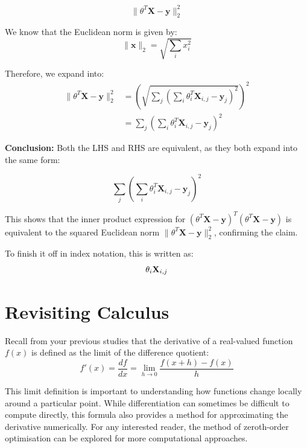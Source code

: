 \begin{equation}
    \| \theta^T \mathbf{X} - \mathbf{y} \|_2^2
\end{equation}

We know that the Euclidean norm is given by:
\begin{equation}
    \| \mathbf{x} \|_2 = \sqrt{\sum_i x_i^2}
\end{equation}

Therefore, we expand into:
\begin{align}
    \| \theta^T \mathbf{X} - \mathbf{y} \|_2^2 & = \left( \sqrt{\sum_j \left( \sum_i \theta_i^T \mathbf{X}_{i,j} - \mathbf{y}_j \right)^2} \right)^2 \\
                                               & = \sum_j \left( \sum_i \theta_i^T \mathbf{X}_{i,j} - \mathbf{y}_j \right)^2
\end{align}


\bigskip

\textbf{Conclusion:} Both the LHS and RHS are equivalent, as they both expand into the same form:

\begin{equation}
    \sum_j \left( \sum_i \theta_i^T \mathbf{X}_{i,j} - \mathbf{y}_j \right)^2
\end{equation}

This shows that the inner product expression for \( (\theta^T \mathbf{X} - \mathbf{y})^T (\theta^T \mathbf{X} - \mathbf{y}) \) is equivalent to the squared Euclidean norm \( \| \theta^T \mathbf{X} - \mathbf{y} \|_2^2 \), confirming the claim.
\bigskip

To finish it off in index notation, this is written as:
\begin{equation}
    \theta_i \mathbf{X}_{i,j}
\end{equation}

\section{Revisiting Calculus}

Recall from your previous studies that the derivative of a real-valued function \( f(x) \) is defined as the limit of the difference quotient:
\begin{equation}
    f'(x) = \frac{df}{dx} = \lim_{h \to 0} \frac{f(x+h) - f(x)}{h}
\end{equation}

This limit definition is important to understanding how functions change locally around a particular point. While differentiation can sometimes be difficult to compute directly, this formula also provides a method for approximating the derivative numerically. For any interested reader, the method of zeroth-order optimisation can be explored for more computational approaches.

